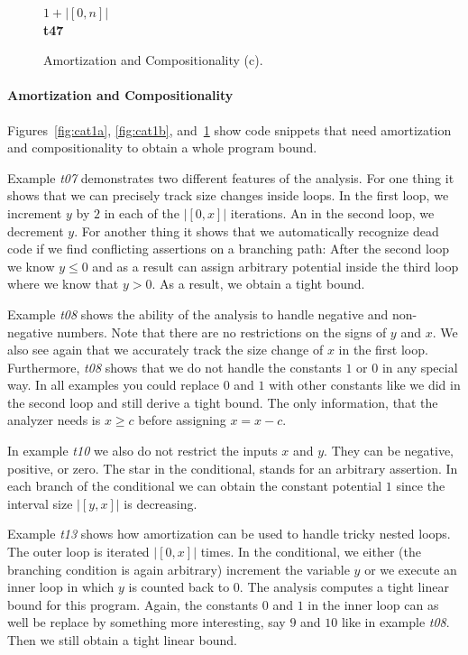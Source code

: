 \documentclass[nocopyrightspace,preprint]{sigplanconf}
\begin{document}
{\begin{figure}[t!]
\begin{minipage}[b]{\progwidth}
\begin{center}
$1 + |[0, n]|$
\\[.7\baselineskip]
      {\bf t47}
    \end{center}
  \end{minipage}

   \caption{Amortization and Compositionality (c).}
  \label{fig:cat1c}
\end{figure}

\paragraph{Amortization and Compositionality}

Figures~\ref{fig:cat1a}, \ref{fig:cat1b}, and~\ref{fig:cat1c} show
code snippets that need amortization and compositionality to obtain a
whole program bound.

Example \emph{t07} demonstrates two different features of the
analysis.  For one thing it shows that we can precisely track size
changes inside loops.  In the first loop, we increment $y$ by $2$ in
each of the $|[0,x]|$ iterations.  An in the second loop, we decrement
$y$.  For another thing it shows that we automatically recognize dead
code if we find conflicting assertions on a branching path: After the
second loop we know $y \leq 0$ and as a result can assign arbitrary
potential inside the third loop where we know that $y>0$.  As a
result, we obtain a tight bound.

Example \emph{t08} shows the ability of the analysis to handle
negative and non-negative numbers.  Note that there are no
restrictions on the signs of $y$ and $x$.  We also see again that we
accurately track the size change of $x$ in the first loop.
Furthermore, \emph{t08} shows that we do not handle the constants $1$
or $0$ in any special way.  In all examples you could replace $0$ and
$1$ with other constants like we did in the second loop and still
derive a tight bound.  The only information, that the analyzer needs
is $x \geq c$ before assigning $x = x - c$.

In example \emph{t10} we also do not restrict the inputs $x$ and $y$.
They can be negative, positive, or zero.  The star {\tt *} in the
conditional, stands for an arbitrary assertion.  In each branch of the
conditional we can obtain the constant potential $1$ since the interval
size $|[y,x]|$ is decreasing.

Example \emph{t13} shows how amortization can be used to handle tricky
nested loops.  The outer loop is iterated $|[0,x]|$ times.  In the
conditional, we either (the branching condition is again arbitrary)
increment the variable $y$ or we execute an inner loop in which $y$ is
counted back to $0$.  The analysis computes a tight linear bound for
this program.  Again, the constants $0$ and $1$ in the inner loop can
as well be replace by something more interesting, say $9$ and $10$
like in example \emph{t08}.  Then we still obtain a tight linear
bound.

}
\end{document}

